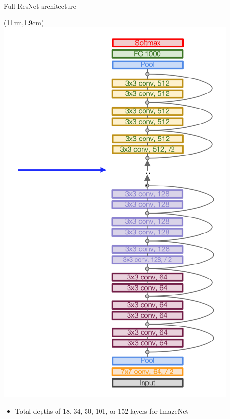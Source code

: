 \documentclass[serif, aspectratio=169]{beamer}
\begin{document}
\begin{frame}{Full ResNet architecture}
	\begin{textblock*}{5cm}(11cm,1.9cm) %
		\includegraphics[keepaspectratio, scale=0.23]{pic/res_arch2}
	\end{textblock*}
	
	\begin{itemize}
		\item Total depths of 18, 34, 50, 101, or 152 layers for ImageNet
	\end{itemize}
\end{frame}
\end{document}
